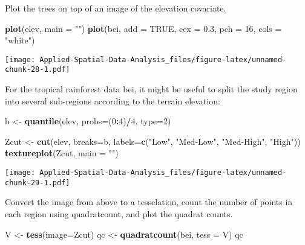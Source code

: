 \documentclass[
]{book}
\newenvironment{Shaded}{\begin{snugshade}}{\end{snugshade}}
\newcommand{\DataTypeTok}[1]{\textcolor[rgb]{0.13,0.29,0.53}{#1}}
\newcommand{\DecValTok}[1]{\textcolor[rgb]{0.00,0.00,0.81}{#1}}
\newcommand{\FloatTok}[1]{\textcolor[rgb]{0.00,0.00,0.81}{#1}}
\newcommand{\KeywordTok}[1]{\textcolor[rgb]{0.13,0.29,0.53}{\textbf{#1}}}
\newcommand{\NormalTok}[1]{#1}
\newcommand{\OperatorTok}[1]{\textcolor[rgb]{0.81,0.36,0.00}{\textbf{#1}}}
\newcommand{\OtherTok}[1]{\textcolor[rgb]{0.56,0.35,0.01}{#1}}
\newcommand{\StringTok}[1]{\textcolor[rgb]{0.31,0.60,0.02}{#1}}
\begin{document}
Plot the trees on top of an image of the elevation covariate.

\begin{Shaded}
\begin{Highlighting}[]
\KeywordTok{plot}\NormalTok{(elev, }\DataTypeTok{main =} \StringTok{""}\NormalTok{)}
\KeywordTok{plot}\NormalTok{(bei, }\DataTypeTok{add =} \OtherTok{TRUE}\NormalTok{, }\DataTypeTok{cex =} \FloatTok{0.3}\NormalTok{, }\DataTypeTok{pch =} \DecValTok{16}\NormalTok{, }\DataTypeTok{cols =} \StringTok{"white"}\NormalTok{)}
\end{Highlighting}
\end{Shaded}

\texttt{[image: Applied-Spatial-Data-Analysis\_files/figure-latex/unnamed-chunk-28-1.pdf]}

For the tropical rainforest data bei, it might be useful to split the study region into several
sub-regions according to the terrain elevation:

\begin{Shaded}
\begin{Highlighting}[]
\NormalTok{b <-}\StringTok{ }\KeywordTok{quantile}\NormalTok{(elev, }\DataTypeTok{probs=}\NormalTok{(}\DecValTok{0}\OperatorTok{:}\DecValTok{4}\NormalTok{)}\OperatorTok{/}\DecValTok{4}\NormalTok{, }\DataTypeTok{type=}\DecValTok{2}\NormalTok{)}

\NormalTok{Zcut <-}\StringTok{ }\KeywordTok{cut}\NormalTok{(elev, }\DataTypeTok{breaks=}\NormalTok{b, }\DataTypeTok{labels=}\KeywordTok{c}\NormalTok{(}\StringTok{"Low"}\NormalTok{, }\StringTok{"Med-Low"}\NormalTok{, }\StringTok{"Med-High"}\NormalTok{, }\StringTok{"High"}\NormalTok{))}
\KeywordTok{textureplot}\NormalTok{(Zcut, }\DataTypeTok{main =} \StringTok{""}\NormalTok{)}
\end{Highlighting}
\end{Shaded}

\texttt{[image: Applied-Spatial-Data-Analysis\_files/figure-latex/unnamed-chunk-29-1.pdf]}

Convert the image from above to a tesselation, count the number of points in each region using quadratcount, and plot the quadrat counts.

\begin{Shaded}
\begin{Highlighting}[]
\NormalTok{V <-}\StringTok{ }\KeywordTok{tess}\NormalTok{(}\DataTypeTok{image=}\NormalTok{Zcut)}
\NormalTok{qc <-}\StringTok{ }\KeywordTok{quadratcount}\NormalTok{(bei, }\DataTypeTok{tess =}\NormalTok{ V)}
\NormalTok{qc}
\end{Highlighting}
\end{Shaded}
\end{document}

